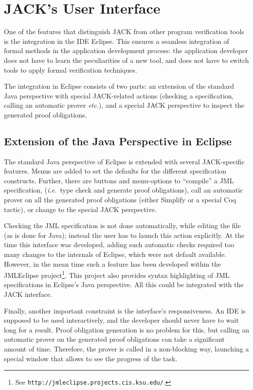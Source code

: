 \section{JACK's User Interface}\label{SecUI}

One of the features that distinguish JACK from other program
verification tools is the integration in the IDE Eclipse. This ensures
a seamless integration of formal methods in the application
development process: the application developer does not have to learn
the peculiarities of a new tool, and does not have to switch tools to
apply formal verification techniques.

The integration in Eclipse consists of two parts: an extension of the
standard Java perspective with special JACK-related actions (checking a
specification, calling an automatic prover \emph{etc.}), and a
special JACK perspective to inspect the generated proof
obligations.

\subsection{Extension of the Java Perspective in Eclipse}

The standard Java perspective of Eclipse is extended with several
JACK-specific features. Menus are added to set the defaults for the
different specification constructs. Further, there are buttons and
menu-options to ``compile'' a JML specification, (\emph{i.e.}\ type
check and generate proof obligations), call an automatic prover on all
the generated proof obligations (either Simplify or a special
Coq tactic), or change to the special JACK perspective.  

Checking the JML specification is not done automatically, while
editing the file (as is done for Java); instead the user has to launch
this action explicitly. At the time this interface was developed,
adding such automatic checks required too many changes to the
internals of Eclipse, which were not default available. However, in
the mean time such a feature has been developed within the JMLEclipse
project\footnote{See
\texttt{http://jmleclipse.projects.cis.ksu.edu/}.}. This project also
provides syntax highlighting of JML specifications in Eclipse's Java
perspective. All this could be integrated with the JACK interface. 


Finally, another important constraint is the interface's
responsiveness. An IDE is supposed to be used interactively, and the
developer should never have to wait long for a result. Proof
obligation generation is no problem for this, but calling an automatic
prover on the generated proof obligations can take a significant
amount of time. Therefore, the prover is called in a non-blocking way,
launching a special window that allows to see the progress of the
task.


